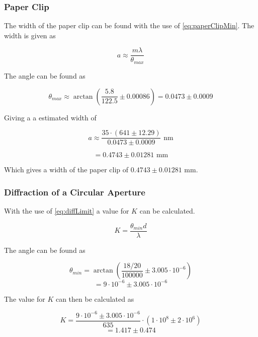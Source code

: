 \documentclass{emulateapj}
\begin{document}
\subsubsection{Paper Clip}

The width of the paper clip can be found with the use of \eqref{eq:paperClipMin}. The width is given as

\begin{equation}
a \approx \frac{m \lambda}{\theta_{max}}
\end{equation}

The angle can be found as 

\begin{equation}
\theta_{max} \approx \arctan\left(\frac{5.8}{122.5} \pm 0.00086\right) =0.0473 \pm 0.0009
\end{equation}

Giving a a estimated width of

\begin{equation}
a \approx \frac{35\cdot (641 \pm 12.29)}{0.0473 \pm 0.0009} \text{ nm}
\end{equation} 

\begin{equation}
= 0.4743 \pm 0.01281 \text{ mm}
\end{equation}\label{eq:widthPaperClip}

Which gives a width of the paper clip of $0.4743 \pm 0.01281 \text{ mm}$.

\subsubsection{Diffraction of a Circular Aperture}

With the use of \eqref{eq:diffLimit} a value for $K$ can be calculated.

\begin{equation}
K = \frac{\theta_{min} d}{\lambda}
\end{equation}

The angle can be found as

\begin{equation}
\theta_{min} = \arctan\left(\frac{18/20}{100000} \pm 3.005\cdot 10^{-6} \right)
\end{equation}
\begin{equation}
= 9\cdot 10^{-6} \pm 3.005\cdot 10^{-6}
\end{equation}

The value for $K$ can then be calculated as 

\begin{equation}
K = \frac{9\cdot 10^{-6} \pm 3.005\cdot 10^{-6}}{635}\cdot(1\cdot10^8 \pm 2\cdot10^6)
\end{equation}
\begin{equation}
= 1.417 \pm 0.474
\end{equation}\label{eq:K}
\end{document}
